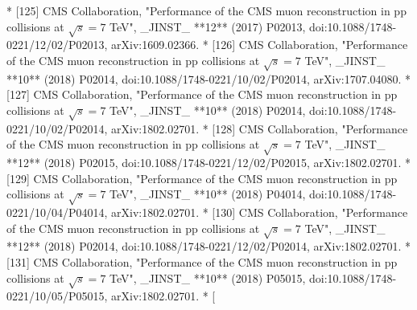 * [125] CMS Collaboration, "Performance of the CMS muon reconstruction in pp collisions at \(\sqrt{s}=7\) TeV", _JINST_ **12** (2017) P02013, doi:10.1088/1748-0221/12/02/P02013, arXiv:1609.02366.
* [126] CMS Collaboration, "Performance of the CMS muon reconstruction in pp collisions at \(\sqrt{s}=7\) TeV", _JINST_ **10** (2018) P02014, doi:10.1088/1748-0221/10/02/P02014, arXiv:1707.04080.
* [127] CMS Collaboration, "Performance of the CMS muon reconstruction in pp collisions at \(\sqrt{s}=7\) TeV", _JINST_ **10** (2018) P02014, doi:10.1088/1748-0221/10/02/P02014, arXiv:1802.02701.
* [128] CMS Collaboration, "Performance of the CMS muon reconstruction in pp collisions at \(\sqrt{s}=7\) TeV", _JINST_ **12** (2018) P02015, doi:10.1088/1748-0221/12/02/P02015, arXiv:1802.02701.
* [129] CMS Collaboration, "Performance of the CMS muon reconstruction in pp collisions at \(\sqrt{s}=7\) TeV", _JINST_ **10** (2018) P04014, doi:10.1088/1748-0221/10/04/P04014, arXiv:1802.02701.
* [130] CMS Collaboration, "Performance of the CMS muon reconstruction in pp collisions at \(\sqrt{s}=7\) TeV", _JINST_ **12** (2018) P02014, doi:10.1088/1748-0221/12/02/P02014, arXiv:1802.02701.
* [131] CMS Collaboration, "Performance of the CMS muon reconstruction in pp collisions at \(\sqrt{s}=7\) TeV", _JINST_ **10** (2018) P05015, doi:10.1088/1748-0221/10/05/P05015, arXiv:1802.02701.
* [ 